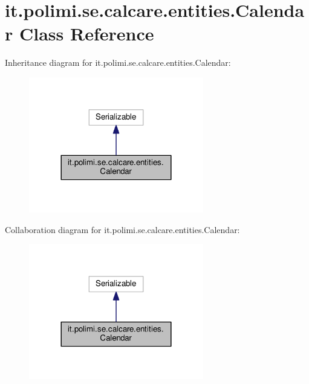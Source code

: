 \hypertarget{classit_1_1polimi_1_1se_1_1calcare_1_1entities_1_1Calendar}{}\section{it.\+polimi.\+se.\+calcare.\+entities.\+Calendar Class Reference}
\label{classit_1_1polimi_1_1se_1_1calcare_1_1entities_1_1Calendar}


Inheritance diagram for it.\+polimi.\+se.\+calcare.\+entities.\+Calendar\+:
\nopagebreak
\begin{figure}[H]
\begin{center}
\leavevmode
\includegraphics[width=216pt]{classit_1_1polimi_1_1se_1_1calcare_1_1entities_1_1Calendar__inherit__graph}
\end{center}
\end{figure}


Collaboration diagram for it.\+polimi.\+se.\+calcare.\+entities.\+Calendar\+:
\nopagebreak
\begin{figure}[H]
\begin{center}
\leavevmode
\includegraphics[width=216pt]{classit_1_1polimi_1_1se_1_1calcare_1_1entities_1_1Calendar__coll__graph}
\end{center}
\end{figure}
